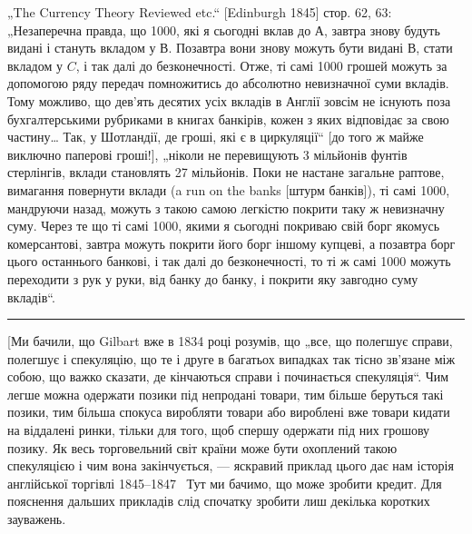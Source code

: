 „The Currency Theory Reviewed etc.“ [Edinburgh 1845] стор. 62, 63: „Незаперечна правда, що 1000, які я сьогодні вклав до $А$, завтра
знову будуть видані і стануть вкладом у $В$. Позавтра вони знову можуть бути
видані $В$, стати вкладом у $C$, і так далі до безконечності. Отже, ті самі
1000 грошей можуть за допомогою ряду передач помножитись до абсолютно невизначної
суми вкладів. Тому можливо, що дев’ять десятих усіх вкладів в Англії зовсім не існують поза
бухгалтерськими рубриками
в книгах банкірів, кожен з яких відповідає за свою частину\dots{} Так, у Шотландії, де гроші, які є в
циркуляції“ [до того ж майже виключно паперові гроші!],
„ніколи не перевищують 3 мільйонів фунтів стерлінгів, вклади становлять 27 мільйонів.
Поки не настане загальне раптове, вимагання повернути вклади (a run
on the banks [штурм банків]), ті самі 1000, мандруючи
назад, можуть з такою самою легкістю покрити таку ж невизначну суму.
Через те що ті самі 1000, якими я сьогодні покриваю свій
борг якомусь комерсантові, завтра можуть покрити його борг іншому купцеві,
а позавтра борг цього останнього банкові, і так далі до безконечності, то ті ж
самі 1000 можуть переходити з рук у руки, від банку до
банку, і покрити яку завгодно суму вкладів“.

\pfbreak{}

[Ми бачили, що Gilbart вже в 1834 році розумів, що „все,
що полегшує справи, полегшує і спекуляцію, що те і друге
в багатьох випадках так тісно зв’язане між собою, що важко
сказати, де кінчаються справи і починається спекуляція“. Чим
легше можна одержати позики під непродані товари, тим більше
беруться такі позики, тим більша спокуса виробляти товари або
вироблені вже товари кидати на віддалені ринки, тільки для того,
щоб спершу одержати під них грошову позику. Як весь торговельний світ країни може бути охоплений
такою спекуляцією
і чим вона закінчується, — яскравий приклад цього дає нам історія
англійської торгівлі 1845--1847~ Тут ми бачимо, що може зробити кредит. Для пояснення дальших
прикладів слід спочатку
зробити лиш декілька коротких зауважень.


